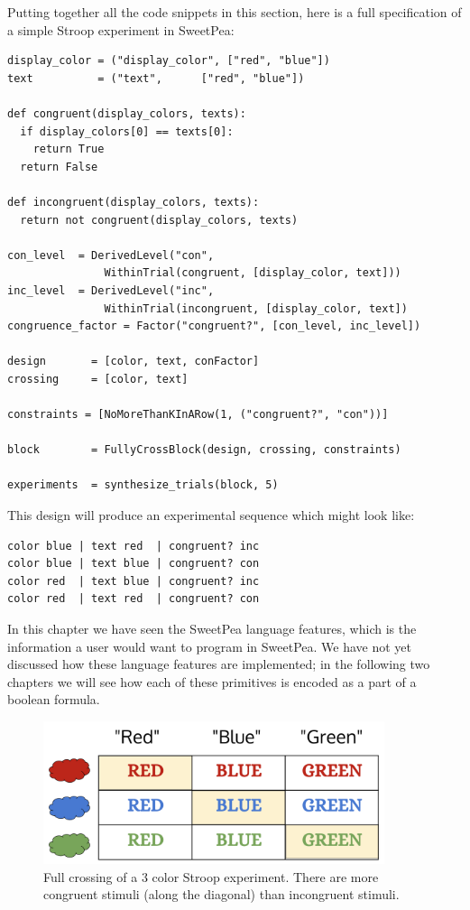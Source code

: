 Putting together all the code snippets in this section, here is a full specification of a simple Stroop experiment in SweetPea:

\begin{verbatim}
display_color = ("display_color", ["red", "blue"])
text          = ("text",      ["red", "blue"])

def congruent(display_colors, texts):
  if display_colors[0] == texts[0]:
    return True
  return False

def incongruent(display_colors, texts):
  return not congruent(display_colors, texts)

con_level  = DerivedLevel("con",
               WithinTrial(congruent, [display_color, text]))
inc_level  = DerivedLevel("inc",
               WithinTrial(incongruent, [display_color, text])
congruence_factor = Factor("congruent?", [con_level, inc_level])

design       = [color, text, conFactor]
crossing     = [color, text]

constraints = [NoMoreThanKInARow(1, ("congruent?", "con"))]

block        = FullyCrossBlock(design, crossing, constraints)

experiments  = synthesize_trials(block, 5)
\end{verbatim}

This design will produce an experimental sequence which might look like:

\begin{verbatim}
color blue | text red  | congruent? inc
color blue | text blue | congruent? con
color red  | text blue | congruent? inc
color red  | text red  | congruent? con
\end{verbatim}


In this chapter we have seen the SweetPea language features, which is the information a user would want to program in SweetPea. We have not yet discussed how these language features are implemented; in the following two chapters we will see how each of these primitives is encoded as a part of a boolean formula.


\begin{figure}
    \centerline{\includegraphics[origin=c,width=10cm]{fig_weighted_crossing}}
    \caption{Full crossing of a 3 color Stroop experiment. There are more congruent stimuli (along the diagonal) than incongruent stimuli.}%
    \label{fig:weighted_crossing_init}%
\end{figure}

